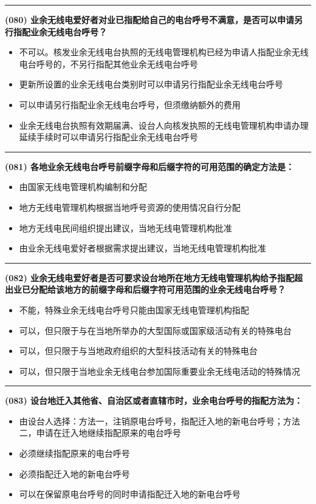 \documentclass[twocolumn]{ctexart}  %
\begin{document}
\noindent\rule{0.5\textwidth}{1pt}
\heiti \textbf{(080) 业余无线电爱好者对业已指配给自己的电台呼号不满意，是否可以申请另行指配业余无线电台呼号？} \songti {\color{gray} [LK0081] }
\begin{itemize}
	\item  不可以。核发业余无线电台执照的无线电管理机构已经为申请人指配业余无线电台呼号的，不另行指配其他业余无线电台呼号
	\item  更新所设置的业余无线电台类别时可以申请另行指配业余无线电台呼号
	\item  可以申请另行指配业余无线电台呼号，但须缴纳额外的费用
	\item  业余无线电台执照有效期届满、设台人向核发执照的无线电管理机构申请办理延续手续时可以申请另行指配业余无线电台呼号
\end{itemize}


\noindent\rule{0.5\textwidth}{1pt}
\heiti \textbf{(081) 各地业余无线电台呼号前缀字母和后缀字符的可用范围的确定方法是：} \songti {\color{gray} [LK0082] }
\begin{itemize}
	\item  由国家无线电管理机构编制和分配
	\item  地方无线电管理机构根据当地呼号资源的使用情况自行分配
	\item  地方无线电民间组织提出建议，当地无线电管理机构批准
	\item  由业余无线电爱好者根据需求提出建议，当地无线电管理机构批准
\end{itemize}


\noindent\rule{0.5\textwidth}{1pt}
\heiti \textbf{(082) 业余无线电爱好者是否可要求设台地所在地方无线电管理机构给予指配超出业已分配给该地方的前缀字母和后缀字符可用范围的业余无线电台呼号？} \songti {\color{gray} [LK0083] }
\begin{itemize}
	\item  不能，特殊业余无线电台呼号只能由国家无线电管理机构指配
	\item  可以，但只限于与在当地所举办的大型国际或国家级活动有关的特殊电台
	\item  可以，但只限于与当地政府组织的大型科技活动有关的特殊电台
	\item  可以，但只限于当地业余无线电台参加国际重要业余无线电活动的特殊情况
\end{itemize}


\noindent\rule{0.5\textwidth}{1pt}
\heiti \textbf{(083) 设台地迁入其他省、自治区或者直辖市时，业余电台呼号的指配方法为：} \songti {\color{gray} [LK0091] }
\begin{itemize}
	\item  由设台人选择：方法一，注销原电台呼号，指配迁入地的新电台呼号；方法二，申请在迁入地继续指配原来的电台呼号
	\item  必须继续指配原来的电台呼号
	\item  必须指配迁入地的新电台呼号
	\item  可以在保留原电台呼号的同时申请指配迁入地的新电台呼号
\end{itemize}
\end{document}

